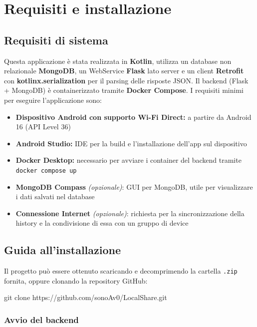 \section{Requisiti e installazione}
\label{sec:requisiti}

\subsection{Requisiti di sistema}

Questa applicazione è stata realizzata in \textbf{Kotlin},
utilizza un database non relazionale \textbf{MongoDB},
un WebService \textbf{Flask} lato server e un client \textbf{Retrofit}
con \textbf{kotlinx.serialization} per il parsing delle risposte JSON.
Il backend (Flask + MongoDB) è containerizzato tramite \textbf{Docker Compose}.
I requisiti minimi per eseguire l'applicazione sono:

\begin{itemize}[leftmargin=1.2cm]
    \item \textbf{Dispositivo Android con supporto Wi-Fi Direct:} a partire da Android 16 (API Level 36)
    \item \textbf{Android Studio:} IDE per la build e l'installazione dell'app sul dispositivo
    \item \textbf{Docker Desktop:} necessario per avviare i container del backend tramite \texttt{docker compose up}
    \item \textbf{MongoDB Compass} \emph{(opzionale)}: GUI per MongoDB, utile per visualizzare i dati salvati nel database
    \item \textbf{Connessione Internet} \emph{(opzionale)}: richiesta per la sincronizzazione della history e la condivisione di essa con un gruppo di device
\end{itemize}

\subsection{Guida all'installazione}

Il progetto può essere ottenuto scaricando e decomprimendo la cartella \texttt{.zip} fornita, oppure clonando la repository GitHub:

\begin{codeblock}[language=bash]
git clone https://github.com/sonoAv0/LocalShare.git
\end{codeblock}

\subsubsection*{Avvio del backend}

